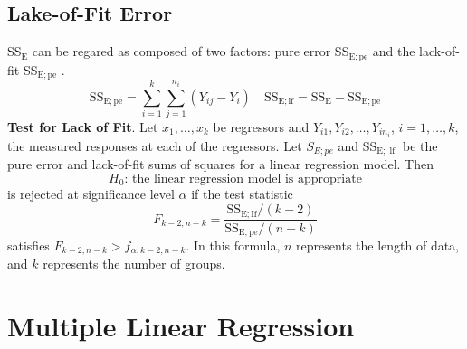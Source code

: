 \documentclass[a4paper,12pt]{article}
\begin{document}
\subsection{Lake-of-Fit Error}
$\operatorname{SS_E}$ can be regared as composed of two factors: pure error $\operatorname{SS_{E;pe}}$  and the lack-of-fit $\operatorname{SS_{E;pe}}$ .
\begin{equation}
    \operatorname{SS_{E;pe}} = \sum_{i=1}^k\sum_{j=1}^{n_i}(Y_{ij}-\bar{Y_i}) \quad \operatorname{SS_{E;lf}} = \operatorname{SS_E}-\operatorname{SS_{E;pe}} 
\end{equation}
\textbf{Test for Lack of Fit}. Let $x_1, \ldots, x_k$ be regressors and $Y_{i 1}, Y_{i 2}, \ldots, Y_{i n_i}$, $i=1, \ldots, k$, the measured responses at each of the regressors. Let $S_{E ; p e}$ and $\mathrm{SS}_{\mathrm{E} ; \text { lf }}$ be the pure error and lack-of-fit sums of squares for a linear regression model. Then
$$H_0 \text{: the linear regression model is appropriate}$$
is rejected at significance level $\alpha$ if the test statistic
$$
F_{k-2, n-k}=\frac{\mathrm{SS}_{\mathrm{E} ; \mathrm{If}} /(k-2)}{\mathrm{SS}_{\mathrm{E} ; \mathrm{pe}} /(n-k)}
$$
satisfies $F_{k-2, n-k}>f_{\alpha, k-2, n-k}$. In this formula, $n$ represents the length of data, and $k$ represents the number of groups.





\section{Multiple Linear Regression}
\end{document}
